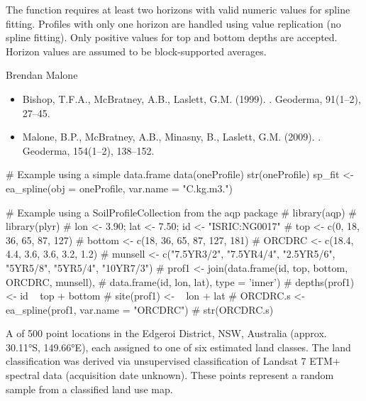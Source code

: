 \documentclass[a4paper]{book}
\begin{document}
%
\begin{Note}
The function requires at least two horizons with valid numeric values for spline fitting. Profiles with only one horizon are handled using value replication (no spline fitting). Only positive values for top and bottom depths are accepted. Horizon values are assumed to be block-supported averages.
\end{Note}
%
\begin{Author}
Brendan Malone
\end{Author}
%
\begin{References}
\begin{itemize}

\item{} Bishop, T.F.A., McBratney, A.B., Laslett, G.M. (1999). . Geoderma, 91(1–2), 27–45.
\item{} Malone, B.P., McBratney, A.B., Minasny, B., Laslett, G.M. (2009). . Geoderma, 154(1–2), 138–152.

\end{itemize}

\end{References}
%
\begin{Examples}
\begin{ExampleCode}
# Example using a simple data.frame
data(oneProfile)
str(oneProfile)
sp_fit <- ea_spline(obj = oneProfile, var.name = "C.kg.m3.")

# Example using a SoilProfileCollection from the aqp package
# library(aqp)
# library(plyr)
# lon <- 3.90; lat <- 7.50; id <- "ISRIC:NG0017"
# top <- c(0, 18, 36, 65, 87, 127)
# bottom <- c(18, 36, 65, 87, 127, 181)
# ORCDRC <- c(18.4, 4.4, 3.6, 3.6, 3.2, 1.2)
# munsell <- c("7.5YR3/2", "7.5YR4/4", "2.5YR5/6", "5YR5/8", "5YR5/4", "10YR7/3")
# prof1 <- join(data.frame(id, top, bottom, ORCDRC, munsell),
#               data.frame(id, lon, lat), type = 'inner')
# depths(prof1) <- id ~ top + bottom
# site(prof1) <- ~ lon + lat
# ORCDRC.s <- ea_spline(prof1, var.name = "ORCDRC")
# str(ORCDRC.s)
\end{ExampleCode}
\end{Examples}
%
\begin{Description}
A  of 500 point locations in the Edgeroi District, NSW, Australia (approx. 30.11°S, 149.66°E), each assigned to one of six estimated land classes. The land classification was derived via unsupervised classification of Landsat 7 ETM+ spectral data (acquisition date unknown). These points represent a random sample from a classified land use map.
\end{Description}
\end{document}
